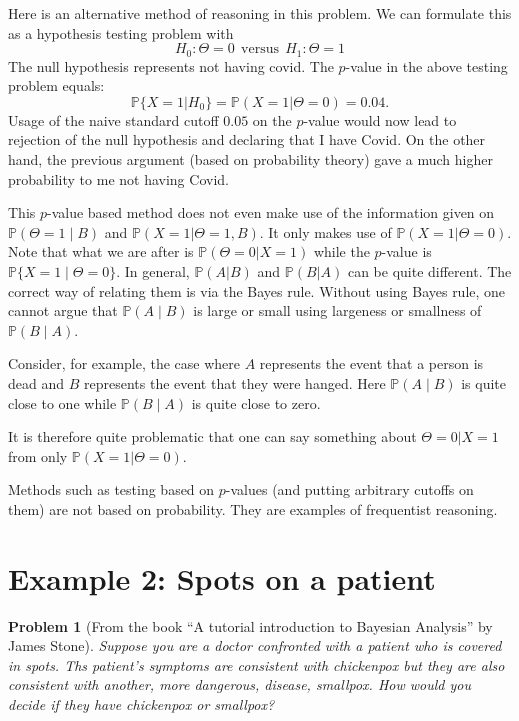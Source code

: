 \documentclass{scrartcl}
\newtheorem{problem}[theorem]{Problem}
\renewcommand{\P}{{\mathbb P}}
\begin{document}
 Here is an alternative method of reasoning in this problem. We
can formulate this as a hypothesis testing problem with
  \begin{equation*}
    H_0 : \Theta = 0  ~~ \text{versus} ~~ H_1: \Theta = 1
  \end{equation*}
The null hypothesis represents not having covid. The $p$-value in
  the above testing problem equals: 
  \begin{equation*}
    \P\{X = 1 | H_0\} = \P(X = 1 | \Theta = 0) = 0.04.
  \end{equation*}
  Usage of the naive standard cutoff $0.05$ on the $p$-value would now lead to
  rejection of the null hypothesis and declaring that I have
  Covid. On the other hand, the previous argument (based on
  probability theory) gave a much higher probability 
  to me not having Covid.

  This $p$-value based method does
  not even make use of the information given on $\P(\Theta = 1 \mid B)$ and
  $\P(X = 1|\Theta = 1, B)$. It only makes use of $\P(X = 1|\Theta = 0)$. Note
  that what we are after is $\P(\Theta = 0|X = 1)$ while the $p$-value
  is $\P\{X = 1 \mid \Theta = 0\}$. In general,
  $\P(A|B)$ and $\P(B|A)$ can be quite different. The correct way of
  relating them is via the Bayes rule. Without using Bayes rule, one
  cannot argue that $\P(A \mid B)$ is large or small using largeness
  or smallness of $\P(B \mid A)$. 

  Consider, for
  example, the case 
  where $A$ represents the event that a person is dead and $B$
  represents the event that they were hanged. Here $\P(A \mid B)$ is
  quite close to one while $\P(B \mid A)$ is quite close to zero. 


  It is therefore quite problematic that one can say something about
  $\Theta = 0|X = 1$ from only $\P(X = 1|\Theta = 0)$. 

   Methods such as testing based on $p$-values (and putting arbitrary
   cutoffs on them) are not based on probability. They are examples of
   frequentist reasoning. 

\section{Example 2: Spots on a patient}
\begin{problem}[From the book ``A tutorial introduction to Bayesian
  Analysis'' by James Stone]
  Suppose you are a doctor confronted with a patient who is covered in
  spots. Ths patient's symptoms are consistent with chickenpox but
  they are also consistent with another, more dangerous, disease,
  smallpox. How would you decide if they have chickenpox or smallpox?
\end{problem}
\end{document}
